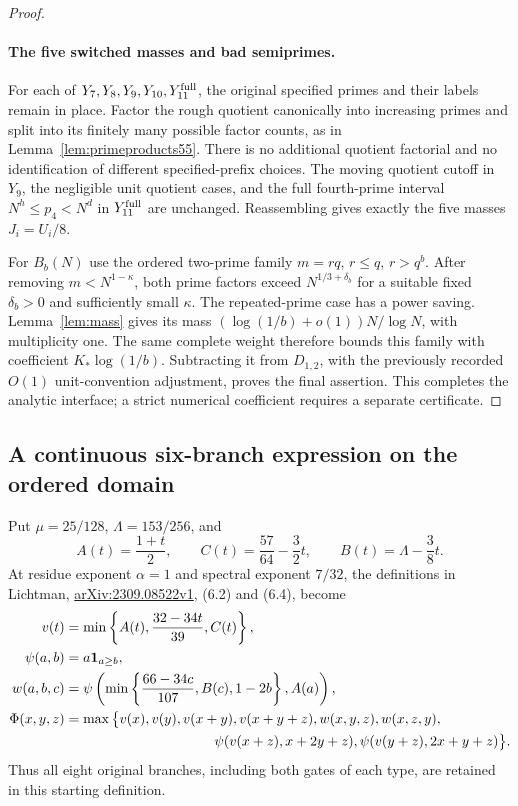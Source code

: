 \documentclass[11pt]{article}
\begin{document}
\begin{proof}
\paragraph{The five switched masses and bad semiprimes.}
For each of $Y_7,Y_8,Y_9,Y_{10},Y_{11}^{\rm full}$, the original
specified primes and their labels remain in place. Factor the rough
quotient canonically into increasing primes and split into its
finitely many possible factor counts, as in
Lemma~\ref{lem:primeproducts55}. There is no additional quotient
factorial and no identification of different specified-prefix
choices. The moving quotient cutoff in $Y_9$, the negligible unit
quotient cases, and the full fourth-prime interval
$N^h\le p_4<N^d$ in $Y_{11}^{\rm full}$ are unchanged.
Reassembling gives exactly the five masses $J_i=U_i/8$.

For $B_b(N)$ use the ordered two-prime family $m=rq$, $r\le q$,
$r>q^b$. After removing $m<N^{1-\kappa}$, both prime factors
exceed $N^{1/3+\delta_b}$ for a suitable fixed $\delta_b>0$ and
sufficiently small $\kappa$. The repeated-prime case has a power
saving. Lemma~\ref{lem:mass} gives its mass
$(\log(1/b)+o(1))N/\log N$, with multiplicity one.
The same complete weight therefore bounds this family with
coefficient $K_*\log(1/b)$. Subtracting it from $D_{1,2}$, with
the previously recorded $O(1)$ unit-convention adjustment, proves
the final assertion. This completes the analytic interface; a
strict numerical coefficient requires a separate certificate.
\end{proof}


\subsection{A continuous six-branch expression on the ordered domain}
\label{sec:variable-envelope-simplification}

Put $\mu=25/128$, $\Lambda=153/256$, and
\[
 A(t)=\frac{1+t}{2},\qquad
 C(t)=\frac{57}{64}-\frac32t,\qquad
 B(t)=\Lambda-\frac38t.
\]
At residue exponent $\alpha=1$ and spectral exponent $7/32$,
the definitions in Lichtman,
\href{https://arxiv.org/html/2309.08522v1}{arXiv:2309.08522v1},
(6.2) and (6.4), become
\begin{align*}
 v(t)&=\min\left\{A(t),\frac{32-34t}{39},C(t)\right\},\\
 \psi(a,b)&=a\mathbf1_{a\ge b},\\
 w(a,b,c)&=\psi\left(
   \min\left\{\frac{66-34c}{107},B(c),1-2b\right\},A(a)\right),\\
 \Phi(x,y,z)&=\max\big\{
 v(x),v(y),v(x+y),v(x+y+z),w(x,y,z),w(x,z,y),\\
 &\hspace{38mm}\psi(v(x+z),x+2y+z),
             \psi(v(y+z),2x+y+z)\big\}.
\end{align*}
Thus all eight original branches, including both gates of each
type, are retained in this starting definition.
\end{document}
